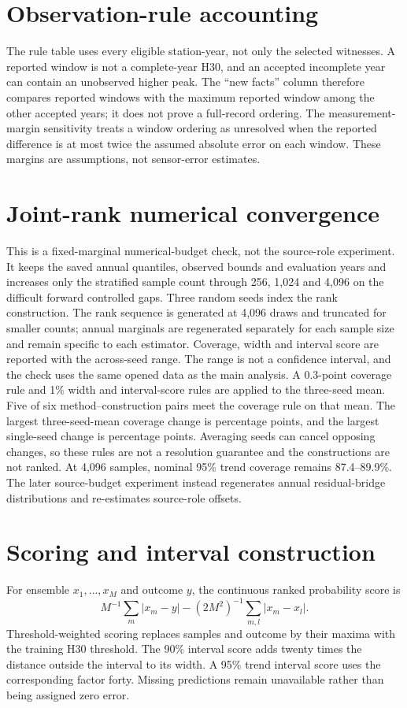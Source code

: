 \documentclass[draft,wrr]{agutexSI2019}
\begin{document}
\begin{article}


\section{Observation-rule accounting}
The rule table uses every eligible station-year, not only the selected witnesses. A reported window is not a complete-year H30, and an accepted incomplete year can contain an unobserved higher peak. The ``new facts'' column therefore compares reported windows with the maximum reported window among the other accepted years; it does not prove a full-record ordering. The measurement-margin sensitivity treats a window ordering as unresolved when the reported difference is at most twice the assumed absolute error on each window. These margins are assumptions, not sensor-error estimates.


\section{Joint-rank numerical convergence}
This is a fixed-marginal numerical-budget check, not the source-role experiment. It keeps the saved annual quantiles, observed bounds and evaluation years and increases only the stratified sample count through 256, 1,024 and 4,096 on the difficult forward controlled gaps. Three random seeds index the rank construction. The rank sequence is generated at 4,096 draws and truncated for smaller counts; annual marginals are regenerated separately for each sample size and remain specific to each estimator. Coverage, width and interval score are reported with the across-seed range. The range is not a confidence interval, and the check uses the same opened data as the main analysis. A 0.3-point coverage rule and 1\% width and interval-score rules are applied to the three-seed mean. Five of six method--construction pairs meet the coverage rule on that mean. The largest three-seed-mean coverage change is \CCRankChangeMax{} percentage points, and the largest single-seed change is \CCRankSeedChangeMax{} percentage points. Averaging seeds can cancel opposing changes, so these rules are not a resolution guarantee and the constructions are not ranked. At 4,096 samples, nominal 95\% trend coverage remains 87.4--89.9\%. The later source-budget experiment instead regenerates annual residual-bridge distributions and re-estimates source-role offsets.

\section{Scoring and interval construction}
For ensemble $x_1,\ldots,x_M$ and outcome $y$, the continuous ranked probability score is
\[ M^{-1}\sum_m|x_m-y|-(2M^2)^{-1}\sum_{m,l}|x_m-x_l|. \]
Threshold-weighted scoring replaces samples and outcome by their maxima with the training H30 threshold. The 90\% interval score adds twenty times the distance outside the interval to its width. A 95\% trend interval score uses the corresponding factor forty. Missing predictions remain unavailable rather than being assigned zero error.


\end{article}
\end{document}
